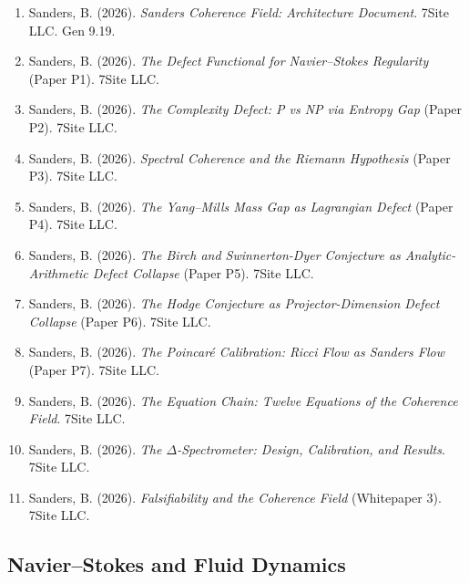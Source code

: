 \documentclass[12pt, openany]{book}
\theoremstyle{remark}
\begin{document}
\begin{enumerate}

\item Sanders, B. (2026). \emph{Sanders Coherence Field: Architecture Document}.
      7Site LLC. Gen 9.19.

\item Sanders, B. (2026). \emph{The Defect Functional for Navier--Stokes Regularity}
      (Paper P1). 7Site LLC.

\item Sanders, B. (2026). \emph{The Complexity Defect: P vs NP via Entropy Gap}
      (Paper P2). 7Site LLC.

\item Sanders, B. (2026). \emph{Spectral Coherence and the Riemann Hypothesis}
      (Paper P3). 7Site LLC.

\item Sanders, B. (2026). \emph{The Yang--Mills Mass Gap as Lagrangian Defect}
      (Paper P4). 7Site LLC.

\item Sanders, B. (2026). \emph{The Birch and Swinnerton-Dyer Conjecture as
      Analytic-Arithmetic Defect Collapse} (Paper P5). 7Site LLC.

\item Sanders, B. (2026). \emph{The Hodge Conjecture as Projector-Dimension
      Defect Collapse} (Paper P6). 7Site LLC.

\item Sanders, B. (2026). \emph{The Poincar\'{e} Calibration: Ricci Flow as
      Sanders Flow} (Paper P7). 7Site LLC.

\item Sanders, B. (2026). \emph{The Equation Chain: Twelve Equations of the
      Coherence Field}. 7Site LLC.

\item Sanders, B. (2026). \emph{The $\Delta$-Spectrometer: Design,
      Calibration, and Results}. 7Site LLC.

\item Sanders, B. (2026). \emph{Falsifiability and the Coherence Field}
      (Whitepaper 3). 7Site LLC.

\end{enumerate}

\subsection*{Navier--Stokes and Fluid Dynamics}
\end{document}
